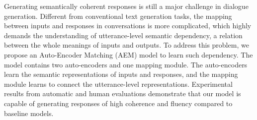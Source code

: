 Generating semantically coherent responses is still a major challenge in dialogue generation. Different from conventional text generation tasks, the mapping between inputs and responses in conversations is more complicated, which highly demands the understanding of utterance-level semantic dependency, a relation between the whole meanings of inputs and outputs. To address this problem, we propose an Auto-Encoder Matching  (AEM) model to learn such  dependency. The model contains two auto-encoders and one mapping module. The auto-encoders learn the semantic representations of inputs and responses, and the mapping module learns to connect the utterance-level representations. Experimental results from automatic and human evaluations demonstrate that our model is capable of generating responses of high coherence and fluency compared to baseline models.
